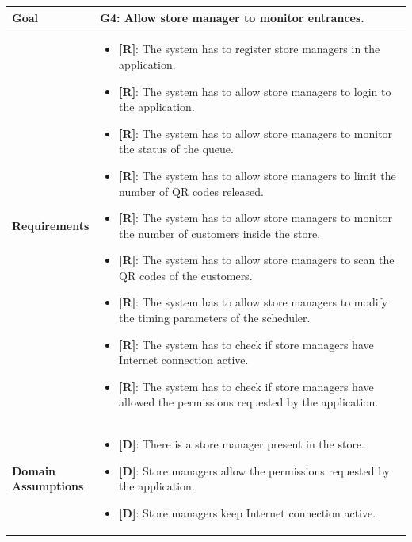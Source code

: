 \begin{table}[H]
\centering
\begin{tabular}{| m{} | m{} |} 
	\hline
	\textbf{Goal} &
		\textbf{G4: Allow store manager to monitor entrances.} \\
	\hline
	\textbf{Requirements} &
		\begin{itemize}
			\item {\textbf{[R]}}: The system has to register store managers in the application.
			\item {\textbf{[R]}}: The system has to allow store managers to login to the application.
			\item {\textbf{[R]}}: The system has to allow store managers to monitor the status of the queue.
			\item {\textbf{[R]}}: The system has to allow store managers to limit the number of QR codes released.
			\item {\textbf{[R]}}: The system has to allow store managers to monitor the number of customers inside the store.
			\item {\textbf{[R]}}: The system has to allow store managers to scan the QR codes of the customers.
			\item {\textbf{[R]}}: The system has to allow store managers to modify the timing parameters of the scheduler.
			\item {\textbf{[R]}}: The system has to check if store managers have Internet connection active.
			\item {\textbf{[R]}}: The system has to check if store managers have allowed the permissions requested by the application.
		\end{itemize} \\ 
	\hline
	\shortstack[l]{\textbf{Domain} \\ \textbf{Assumptions}} & 
		\begin{itemize}
			\item {\textbf{[D]}}: There is a store manager present in the store.
			\item {\textbf{[D]}}: Store managers allow the permissions requested by the application.
			\item {\textbf{[D]}}: Store managers keep Internet connection active.
		\end{itemize} \\ 
	\hline
\end{tabular}
\end{table}

